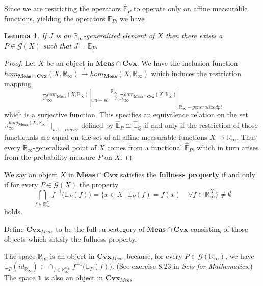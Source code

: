 \documentclass[11pt]{amsart}    %
\newtheorem{lemma}{Lemma}
\newcommand{\Rinf}{\mathbb{R}_{\infty}}
\newcommand{\be}{\begin{equation}}
\newcommand{\ee}{\end{equation}}
\newcommand{\G}{\mathcal{G}}
\begin{document}
Since we are restricting the operators $\hat{\mathbb{E}}_{P}$ to operate only on affine measurable functions, yielding the operators $\mathbb{E}_P$, we have
\begin{lemma}
  If $J$ is an $\mathbb{R}_{\infty}$-generalized element of $X$ then there exists a $P \in \G(X)$ such that $J=\mathbb{E}_P$.
\end{lemma}
\begin{proof}
Let $X$ be an object in $\mathbf{Meas} \cap \mathbf{Cvx}$.  We have the inclusion function $hom_{\mathbf{Meas} \cap \mathbf{Cvx}}(X, \mathbb{R}_{\infty}) \xrightarrow{\iota} hom_{\mathbf{Meas}}(X, \mathbb{R}_{\infty})$ which induces the restriction mapping
\be
\mathbb{R}_{\infty}^{hom_{\mathbf{Meas}}(X,\mathbb{R}_{\infty})}|_{wa+sc} \xrightarrow{\mathbb{R}_{\infty}^{\iota}} \mathbb{R}_{\infty}^{hom_{\mathbf{Meas} \cap \mathbf{Cvx}}(X, \mathbb{R}_{\infty})}|_{\Rinf -generalized pt}
\ee
which is a surjective function.  This specifies an equivalence relation on the set $\mathbb{R}_{\infty}^{hom_{\mathbf{Meas}}(X,\mathbb{R}_{\infty})}|_{wa+linear}$ defined by $\hat{\mathbb{E}}_P \cong \hat{\mathbb{E}}_Q$ if and only if the restriction of those functionals are equal on the set of all affine measurable functions $X \rightarrow \mathbb{R}_{\infty}$.  Thus every $\mathbb{R}_{\infty}$-generalized point of $X$ comes from a functional $\hat{\mathbb{E}}_P$, which in turn arises from the probability measure $P$ on $X$.
\end{proof}


We say an object $X$ in $\mathbf{Meas} \cap \mathbf{Cvx}$ satisfies the \textbf{fullness property} if and only if for every $P \in \G(X)$ the property
\begin{equation}
\displaystyle{ \bigcap_{f \in \mathbb{R}_{\infty}^X}} f^{-1}\big(\mathbb{E}_{P}(f)\big) = \{x \in X \, | \, \mathbb{E}_P(f)=f(x) \quad \forall f \in \mathbb{R}_{\infty}^X\} \ne \emptyset
\end{equation}
holds.

Define $\mathbf{Cvx}_{Meas}$ to be the full subcategory of $\mathbf{Meas} \cap \mathbf{Cvx}$ consisting of those objects which satisfy the fullness property.  

The space $\mathbb{R}_{\infty}$ is an object in $\mathbf{Cvx}_{Meas}$ because, for every $P \in \G(\mathbb{R}_{\infty})$, we have $\mathbb{E}_P(id_{\mathbb{R}_{\infty}}) \in \cap_{f \in \mathbb{R}_{\infty}^{\mathbb{R}_{\infty} }} f^{-1}\big(\mathbb{E}_{P}(f)\big)$.  (See exercise 8.23 in \textit{Sets for Mathematics}.)  The space $\mathbf{1}$ is also an object in $\mathbf{Cvx}_{Meas}$.
\end{document}
